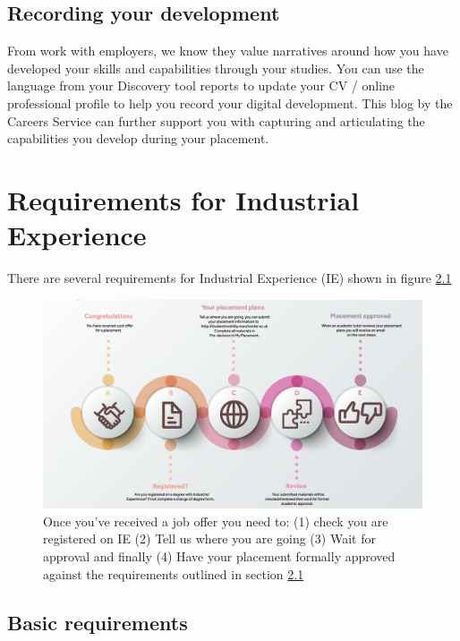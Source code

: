 \documentclass[
]{book}
\begin{document}
\section{Recording your development}\label{development}

From work with employers, we know they value narratives around how you have developed your skills and capabilities through your studies. You can use the language from your Discovery tool reports to update your CV / online professional profile to help you record your digital development. This blog by the Careers Service can further support you with capturing and articulating the capabilities you develop during your placement. \citep{conway}

\chapter{Requirements for Industrial Experience}\label{requirements}

There are several requirements for Industrial Experience (IE) shown in figure \ref{fig:plans-fig}

\begin{figure}

{\centering \includegraphics[width=1\linewidth]{images/plans} 

}

\caption{Once you've received a job offer you need to: (1) check you are registered on IE (2) Tell us where you are going (3) Wait for approval and finally (4) Have your placement formally approved against the requirements outlined in section \ref{basic}}\label{fig:plans-fig}
\end{figure}



\section{Basic requirements}\label{basic}
\end{document}
